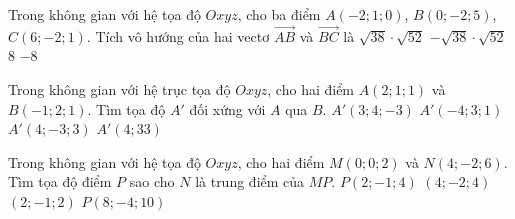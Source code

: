 \begin{ex}%
Trong không gian với hệ tọa độ $Oxyz$, cho ba điểm $A(-2; 1; 0)$, $B(0;-2; 5)$, $C(6;-2;1)$. Tích vô hướng của hai vectơ $\overrightarrow{AB}$ và $\overrightarrow{BC}$ là
\choice
{$\sqrt{38}\cdot\sqrt{52}$}
{$-\sqrt{38}\cdot\sqrt{52}$}
{$8$}
{\True $-8$}
\end{ex}


\begin{ex}%
Trong không gian với hệ trục tọa độ $Oxyz$, cho hai điểm $A(2;1;1)$ và $B(-1;2;1)$. Tìm tọa độ $A'$ đối xứng với $A$ qua $B$.
\choice
{$A'(3;4;-3)$}
{\True $A'(-4;3;1)$}
{$A'(4;-3;3)$}
{$A'(4;33)$}
\end{ex}


\begin{ex}%
Trong không gian với hệ tọa độ $Oxyz$, cho hai điểm $M(0;0;2)$ và $N(4;-2;6)$. Tìm tọa độ điểm $P$ sao cho $N$ là trung điểm của $MP$.
\choice
{$P(2;-1;4)$}
{$(4;-2;4)$}
{$(2;-1;2)$}
{\True $P(8;-4; 10)$}
\end{ex}


